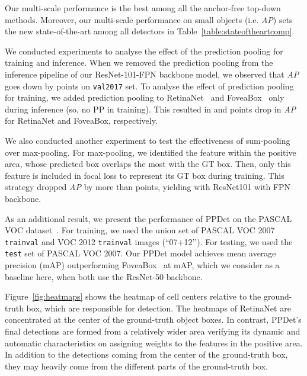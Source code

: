 \documentclass{bmvc2k}
\begin{document}
Our multi-scale performance is the best among all the anchor-free top-down methods. Moreover, our multi-scale performance  on small objects (i.e. \textit{AP}) sets the new  state-of-the-art among all detectors in Table~\ref{table:stateoftheartcomp}.










We conducted experiments to analyse the effect of the prediction pooling for training and inference. When we removed the prediction pooling from the inference pipeline of our ResNet-101-FPN backbone model, we observed that \textit{AP} goes down by  points on \texttt{val2017} set. To analyse the effect of prediction pooling for training, we added prediction pooling to RetinaNet~\cite{retinanet} and FoveaBox~\cite{foveabox} only during inference (so, no PP in training). This resulted in  and  points drop in  \textit{AP} for RetinaNet and FoveaBox, respectively.




We also conducted another experiment to test the effectiveness of sum-pooling over max-pooling. For max-pooling, we identified the feature within the positive area, whose predicted box overlaps the most with the GT box. Then, only this feature is included in focal loss to represent its GT box during training.  This strategy dropped \textit{AP} by more than  points, yielding  with ResNet101 with FPN backbone.


As an additional result, we present the performance of PPDet on the PASCAL VOC dataset~\cite{pascal}. For training, we used the union set of PASCAL VOC 2007 \texttt{trainval} and VOC 2012 \texttt{trainval} images (``07+12’’). For testing, we used the \texttt{test} set of PASCAL VOC 2007. Our PPDet model achieves  mean average precision (mAP) outperforming FoveaBox~\cite{foveabox} at  mAP, which we consider as a baseline here, when both use the ResNet-50 backbone.




Figure~\ref{fig:heatmaps} shows the heatmap of cell centers relative to the ground-truth box, which are responsible for detection. The heatmaps of RetinaNet are concentrated at the center of the ground-truth object boxes. In contrast, PPDet’s final detections are formed from a relatively wider area verifying its dynamic and automatic characteristics on assigning
weights to the features in the positive area. In addition to the detections coming from the center of the ground-truth box, they may heavily come from the different parts of the ground-truth box.  
\end{document}
